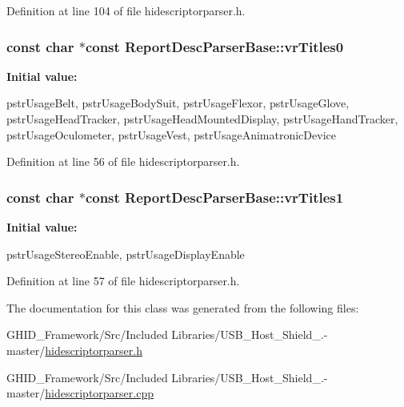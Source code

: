 \-Definition at line 104 of file hidescriptorparser.\-h.

\hypertarget{class_report_desc_parser_base_a42d34a0a49f987c9dcfdd4fb8d42bf0d}{
\subsubsection[{vr\-Titles0}]{\setlength{\rightskip}{0pt plus 5cm}const char $\ast$const {\bf \-Report\-Desc\-Parser\-Base\-::vr\-Titles0}}}\label{class_report_desc_parser_base_a42d34a0a49f987c9dcfdd4fb8d42bf0d}
{\bfseries \-Initial value\-:}
\begin{DoxyCode}
 {
        pstrUsageBelt,
        pstrUsageBodySuit,
        pstrUsageFlexor,
        pstrUsageGlove,
        pstrUsageHeadTracker,
        pstrUsageHeadMountedDisplay,
        pstrUsageHandTracker,
        pstrUsageOculometer,
        pstrUsageVest,
        pstrUsageAnimatronicDevice
}
\end{DoxyCode}


\-Definition at line 56 of file hidescriptorparser.\-h.

\hypertarget{class_report_desc_parser_base_a41af57cb0fb0bbed7277bcd04a9e9fe9}{
\subsubsection[{vr\-Titles1}]{\setlength{\rightskip}{0pt plus 5cm}const char $\ast$const {\bf \-Report\-Desc\-Parser\-Base\-::vr\-Titles1}}}\label{class_report_desc_parser_base_a41af57cb0fb0bbed7277bcd04a9e9fe9}
{\bfseries \-Initial value\-:}
\begin{DoxyCode}
 {
        pstrUsageStereoEnable,
        pstrUsageDisplayEnable
}
\end{DoxyCode}


\-Definition at line 57 of file hidescriptorparser.\-h.



\-The documentation for this class was generated from the following files\-:\begin{DoxyCompactItemize}
\item 
\-G\-H\-I\-D\-\_\-\-Framework/\-Src/\-Included Libraries/\-U\-S\-B\-\_\-\-Host\-\_\-\-Shield\-\_.-\/master/\hyperlink{hidescriptorparser_8h}{hidescriptorparser.\-h}\item 
\-G\-H\-I\-D\-\_\-\-Framework/\-Src/\-Included Libraries/\-U\-S\-B\-\_\-\-Host\-\_\-\-Shield\-\_.-\/master/\hyperlink{hidescriptorparser_8cpp}{hidescriptorparser.\-cpp}\end{DoxyCompactItemize}
